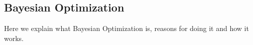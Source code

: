 \subsection{Bayesian Optimization}\label{sec:bayesianoptimization}
Here we explain what Bayesian Optimization is, reasons for doing it and how it works.